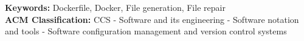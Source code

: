 \documentclass[11pt,a4paper]{article}
\newcommand{\titles}[2]{\noindent\textbf{#1:} #2\\[2mm]}
\begin{document}
\titles{Keywords}{Dockerfile, Docker, File generation, File repair}
\titles{ACM Classification}{CCS - Software and its engineering - Software notation and tools - Software configuration management and version control systems
}






\end{document}
